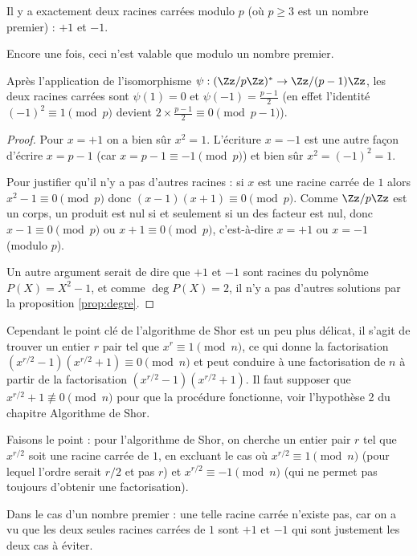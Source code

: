 \documentclass[11pt,class=report,crop=false]{standalone}
\begin{document}
\begin{proposition}
Il y a exactement deux racines carrées modulo $p$ (où $p\ge3$ est un nombre premier) :
$+1$ et $-1$.
\end{proposition}

Encore une fois, ceci n'est valable que modulo un nombre premier.


Après l'application de l'isomorphisme $\psi : (\Zz/p\Zz)^* \to \Zz/(p-1)\Zz$, 
les deux racines carrées sont $\psi(1)=0$ et $\psi(-1) = \frac{p-1}{2}$ (en effet l'identité $(-1)^2 \equiv 1 \pmod {p}$ devient $2 \times \frac{p-1}{2} \equiv 0 \pmod{p-1}$).

\begin{proof}
Pour $x=+1$ on a bien sûr $x^2=1$. L'écriture $x=-1$ est une autre façon d'écrire $x=p-1$ (car $x = p-1 \equiv -1 \pmod{p}$) et bien sûr $x^2 = (-1)^2 = 1$.

Pour justifier qu'il n'y a pas d'autres racines : si $x$ est une racine carrée de $1$ alors $x^2 - 1 \equiv 0 \pmod{p}$ donc $(x-1)(x+1) \equiv 0 \pmod p$.
Comme $\Zz/p\Zz$ est un corps, un produit est nul si et seulement si un des facteur est nul, donc $x-1 \equiv 0 \pmod p$ ou $x+1 \equiv 0 \pmod p$, c'est-à-dire $x=+1$ ou $x=-1$ (modulo $p$).

Un autre argument serait de dire que $+1$ et $-1$ sont racines du polynôme $P(X) = X^2-1$, et comme $\deg P(X)=2$, il n'y a pas d'autres solutions par la proposition \ref{prop:degre}.
\end{proof}

\bigskip

Cependant le point clé de l'algorithme de Shor est un peu plus délicat, il s'agit de trouver un entier $r$ pair tel que $x^r \equiv 1 \pmod{n}$, ce qui donne la factorisation
$(x^{r/2}-1)(x^{r/2}+1) \equiv 0 \pmod n$ et peut conduire à une factorisation de $n$ à partir de la factorisation $(x^{r/2}-1)(x^{r/2}+1)$.
Il faut supposer que $x^{r/2}+1 \not\equiv 0 \pmod{n}$ pour que la procédure fonctionne, voir l'hypothèse 2 du chapitre \og{}Algorithme de Shor\fg{}.

Faisons le point : pour l'algorithme de Shor, on cherche un entier pair $r$ tel que $x^{r/2}$ soit une racine carrée de $1$, en excluant le cas où $x^{r/2} \equiv 1 \pmod{n}$ (pour lequel l'ordre serait $r/2$ et pas $r$)
et $x^{r/2} \equiv -1 \pmod{n}$ (qui ne permet pas toujours d'obtenir une factorisation).

Dans le cas d'un nombre premier : une telle racine carrée n'existe pas, car on a vu que les deux seules racines carrées de $1$ sont $+1$ et $-1$ qui sont justement les deux cas à éviter.
\end{document}
